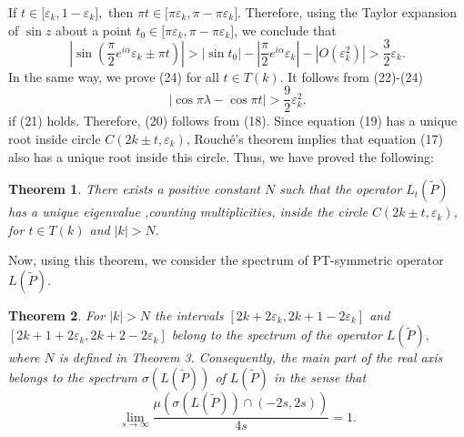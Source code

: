 \documentclass{article}%
\newtheorem{theorem}{Theorem}
{}
\begin{document}
If $t\in\lbrack\varepsilon_{k},1-\varepsilon_{k}],$ then $\pi t\in\lbrack
\pi\varepsilon_{k},\pi-\pi\varepsilon_{k}].$ Therefore, using the Taylor
expansion of $\sin z$ about a point $t_{0}\in\lbrack\pi\varepsilon_{k},\pi
-\pi\varepsilon_{k}]$, we conclude that
\begin{equation}
\left\vert \sin(\frac{\pi}{2}e^{i\alpha}\varepsilon_{k}\pm\pi t)\right\vert
>\left\vert \sin t_{0}\right\vert -\left\vert \frac{\pi}{2}e^{i\alpha
}\varepsilon_{k}\right\vert -\left\vert O(\varepsilon_{k}^{2})\right\vert
>\frac{3}{2}\varepsilon_{k}. \tag{24}%
\end{equation}
In the same way, we prove (24) for all $t\in T(k).$ It follows from (22)-(24)
\[
\left\vert \cos\pi\lambda-\cos\pi t\right\vert >\frac{9}{2}\varepsilon_{k}%
^{2}.
\]
if (21) holds. Therefore, (20) follows from (18). Since equation (19) has a
unique root inside circle $C(2k\pm t,\varepsilon_{k})$, Rouch\'{e}'s theorem
implies that equation (17) also has a unique root inside this circle. Thus, we
have proved the following:

\begin{theorem}
There exists a positive constant $N$ such that the operator $L_{t}\left(
\widetilde{P}\right)  $ has a unique eigenvalue ,counting multiplicities,
inside the circle $C(2k\pm t,\varepsilon_{k})$, for $t\in T(k)$ and
$\left\vert k\right\vert >N.$
\end{theorem}

Now, using this theorem, we consider the spectrum of PT-symmetric operator
$L\left(  \widetilde{P}\right)  .$

\begin{theorem}
For $\left\vert k\right\vert >N$ the intervals $[2k+2\varepsilon
_{k},2k+1-2\varepsilon_{k}]$ and $[2k+1+2\varepsilon_{k},2k+2-2\varepsilon
_{k}]$ belong to the spectrum of the operator $L\left(  \widetilde{P}\right)
,$ where $N$ is defined in Theorem 3. Consequently, the main part of the real
axis belongs to the spectrum $\sigma(L\left(  \widetilde{P}\right)  )$ of
$L\left(  \widetilde{P}\right)  $ in the sense that
\begin{equation}
\lim_{s\rightarrow\infty}\frac{\mu(\sigma(L\left(  \widetilde{P}\right)
)\cap(-2s,2s))}{4s}=1. \tag{25}%
\end{equation}

\end{theorem}
\end{document}
